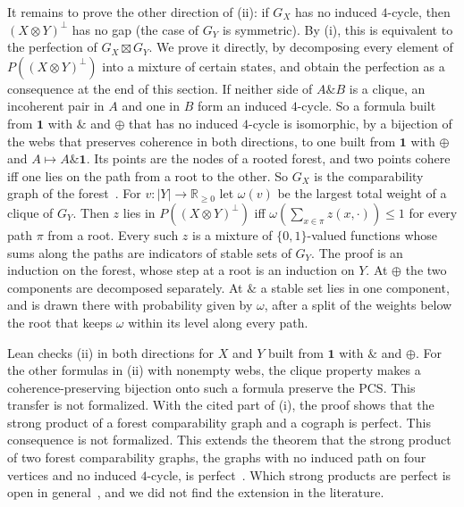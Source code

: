 It remains to prove the other direction of (ii): if $G_X$ has no induced
$4$-cycle, then $(X \otimes Y)^{\perp}$ has no gap (the case of $G_Y$ is
symmetric). By (i), this is equivalent to the perfection of
$G_X \boxtimes G_Y$. We prove it directly, by decomposing every element of
$P((X \otimes Y)^{\perp})$ into a mixture of certain states, and obtain the
perfection as a consequence at the end of this section. If neither side of
$A \mathbin{\&} B$ is a clique, an incoherent pair in $A$ and one in $B$
form an induced $4$-cycle. So a formula built from $\mathbf{1}$ with
$\mathbin{\&}$ and $\oplus$ that has no induced $4$-cycle is isomorphic,
by a bijection of the webs that preserves coherence in both directions, to
one built from $\mathbf{1}$ with $\oplus$ and
$A \mapsto A \mathbin{\&} \mathbf{1}$. Its points
are the nodes of a rooted forest, and two points cohere iff one lies on the
path from a root to the other. So $G_X$ is the comparability graph of the
forest~\cite{wolk1962,golumbic1978}. For $v : |Y| \to \mathbb{R}_{\ge 0}$
let $\omega(v)$ be the largest total weight of a clique of $G_Y$. Then
$z$ lies in $P((X \otimes Y)^{\perp})$ iff
$\omega(\sum_{x \in \pi} z(x, \cdot)) \le 1$ for every path $\pi$ from a
root. Every such $z$ is a mixture of
$\{0,1\}$-valued functions whose sums along the paths are indicators of
stable sets of $G_Y$. The proof is an induction on the
forest, whose step at a root is an induction on $Y$. At $\oplus$ the two
components are decomposed separately. At $\mathbin{\&}$ a stable set lies
in one component, and is drawn there with probability given by $\omega$,
after a split of the weights below the root that keeps $\omega$ within its
level along every path.

Lean checks (ii) in both directions for $X$ and $Y$ built from
$\mathbf{1}$ with $\mathbin{\&}$ and $\oplus$. For the
other formulas in (ii) with nonempty webs, the clique property makes a
coherence-preserving bijection onto such a formula preserve the PCS. This transfer is not formalized. With the cited part of (i), the proof shows that the strong product of a
forest comparability graph and a cograph is perfect. This consequence is
not formalized. This extends the theorem that the strong product of two forest
comparability graphs, the graphs with no induced path on four vertices
and no induced $4$-cycle, is perfect~\cite{ravindra1978}. Which strong products are perfect is open
in general~\cite{mandrescu2022}, and we did not find the extension in the
literature.

